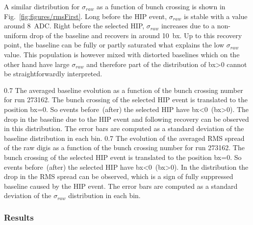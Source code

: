 A similar distribution for $\sigma_{raw}$  as a function of bunch crossing is shown in Fig.~\ref{fig:figures/rmsFirst}. Long before the HIP event, $\sigma_{raw}$ is stable with a value around 8~ADC. Right before the selected HIP, $\sigma_{raw}$ increases due to a non-uniform drop of the baseline and recovers in around 10~bx. Up to this recovery point, the baseline can be fully or partly saturated what explains the low $\sigma_{raw}$ value. This population is however mixed with distorted baselines which on the other hand have large $\sigma_{raw}$ and therefore part of the distribution of bx>0 cannot be straightforwardly interpreted.

                 {0.7}       %
                 {The averaged baseline evolution as a function of the bunch crossing number for run 273162. The bunch crossing of the selected HIP event is translated to the position bx=0. So events before~(after) the selected HIP have bx<0~(bx>0). The drop in the baseline due to the HIP event and following recovery can be observed in this distribution. The error bars are computed as a standard deviation of the baseline distribution in each bin. } %
                 {0.7}       %
                 {The evolution of the averaged RMS spread of the raw digis as a function of the bunch crossing number for run 273162. The bunch crossing of the selected HIP event is translated to the position bx=0. So events before~(after) the selected HIP have bx<0~(bx>0). In the distribution the drop in the RMS spread can be observed, which is a sign of fully suppressed baseline caused by the HIP event. The error bars are computed as a standard deviation of the $\sigma_{raw}$ distribution in each bin.  } %

\subsubsection{Results}

